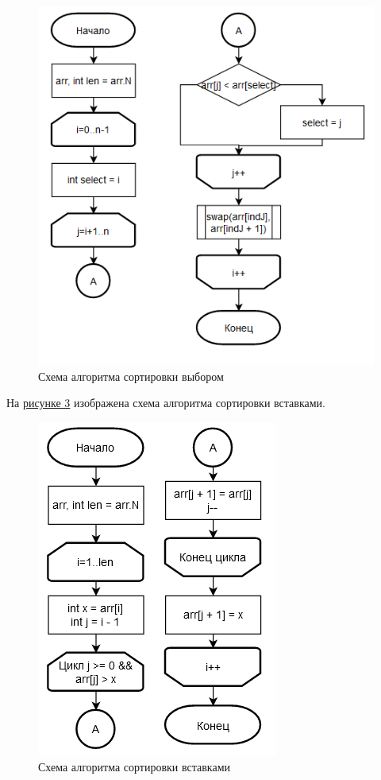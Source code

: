 \documentclass[14pt, a4paper]{extarticle}
\begin{document}
\begin{figure}[h!]
	\centering
	\includegraphics[height=0.7\textheight]{source/Schema2.png}
	\caption{Схема алгоритма сортировки выбором}
	\label{Schema2}
\end{figure}
\clearpage
На \hyperref[Schema3]{рисунке 3} изображена схема алгоритма сортировки вставками.
\begin{figure}[h!]
	\centering
	\includegraphics[height=0.7\textheight]{source/Schema3.png}
	\caption{Схема алгоритма сортировки вставками}
	\label{Schema3}
\end{figure}	
\end{document}
